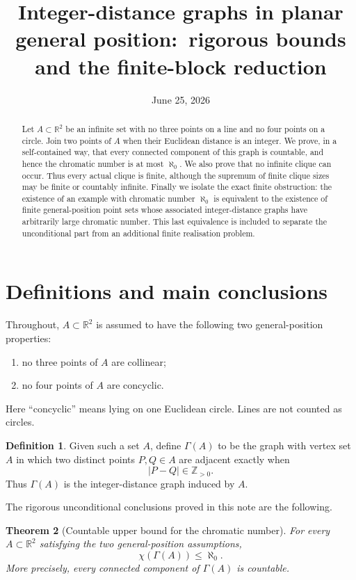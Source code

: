 \documentclass[11pt,a4paper]{amsart}
\title[Integer-distance graphs in planar general position]{Integer-distance graphs in planar general position:\ rigorous bounds and the finite-block reduction}
\author{}
\date{June 25, 2026}
\newtheorem{theorem}{Theorem}[section]
\theoremstyle{definition}
\newtheorem{definition}[theorem]{Definition}
\newcommand{\R}{\mathbb{R}}
\newcommand{\Z}{\mathbb{Z}}
\begin{document}
\maketitle

\begin{abstract}
Let $A\subset \R^2$ be an infinite set with no three points on a line and no four points on a circle.  Join two points of $A$ when their Euclidean distance is an integer.  We prove, in a self-contained way, that every connected component of this graph is countable, and hence the chromatic number is at most $\aleph_0$.  We also prove that no infinite clique can occur.  Thus every actual clique is finite, although the supremum of finite clique sizes may be finite or countably infinite.  Finally we isolate the exact finite obstruction: the existence of an example with chromatic number $\aleph_0$ is equivalent to the existence of finite general-position point sets whose associated integer-distance graphs have arbitrarily large chromatic number.  This last equivalence is included to separate the unconditional part from an additional finite realisation problem.
\end{abstract}

\section{Definitions and main conclusions}

Throughout, $A\subset \R^2$ is assumed to have the following two general-position properties:
\begin{enumerate}[label=(\roman*)]
    \item no three points of $A$ are collinear;
    \item no four points of $A$ are concyclic.
\end{enumerate}
Here ``concyclic'' means lying on one Euclidean circle.  Lines are not counted as circles.

\begin{definition}
Given such a set $A$, define $\Gamma(A)$ to be the graph with vertex set $A$ in which two distinct points $P,Q\in A$ are adjacent exactly when
\[
        |P-Q|\in \Z_{>0}.
\]
Thus $\Gamma(A)$ is the integer-distance graph induced by $A$.
\end{definition}

The rigorous unconditional conclusions proved in this note are the following.

\begin{theorem}[Countable upper bound for the chromatic number]\label{thm:countable-upper}
For every $A\subset \R^2$ satisfying the two general-position assumptions,
\[
        \chi(\Gamma(A))\leq \aleph_0.
\]
More precisely, every connected component of $\Gamma(A)$ is countable.
\end{theorem}
\end{document}
